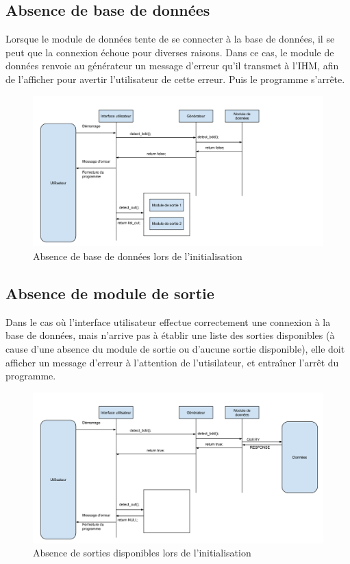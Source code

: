 \subsection{Absence de base de données}
\label{scenarii:init:nobdd}
        
Lorsque le module de données tente de se connecter à la base de données, il 
se peut que la connexion échoue pour diverses raisons. Dans ce cas, le 
module de données renvoie au générateur un message d'erreur qu'il transmet à
 l'IHM, afin de l'afficher pour avertir l'utilisateur de cette erreur. Puis 
 le programme s'arrête.
        
\begin{figure}[!h]
\includegraphics[width=14cm]{data/demarrage_absence_bdd.png}
\caption{Absence de base de données lors de l'initialisation}
\end{figure}
        
\subsection{Absence de module de sortie}
\label{scenarii:init:noout}

Dans le cas où l'interface utilisateur effectue correctement une connexion à 
la base de données, mais n'arrive pas à établir une liste des sorties 
disponibles (à cause d'une absence du module de sortie ou d'aucune sortie 
disponible), elle doit afficher un message d'erreur à l'attention de 
l'utisilateur, et entraîner l'arrêt du programme.
        
\begin{figure}[!h]
\includegraphics[width=14cm]{data/demarrage_absence_sortie.png}
\caption{Absence de sorties disponibles lors de l'initialisation}
\end{figure}
 

